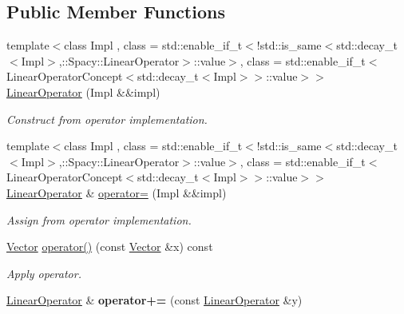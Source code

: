 \subsection*{Public Member Functions}
\begin{DoxyCompactItemize}
\item 
\hypertarget{classSpacy_1_1LinearOperator_aa6de056041a02ac4fbfc457f1539ac8b}{}{\footnotesize template$<$class Impl , class  = std\+::enable\+\_\+if\+\_\+t$<$!std\+::is\+\_\+same$<$std\+::decay\+\_\+t$<$\+Impl$>$,\+::\+Spacy\+::\+Linear\+Operator$>$\+::value$>$, class  = std\+::enable\+\_\+if\+\_\+t$<$\+Linear\+Operator\+Concept$<$std\+::decay\+\_\+t$<$\+Impl$>$$>$\+::value$>$$>$ }\\\hyperlink{classSpacy_1_1LinearOperator_aa6de056041a02ac4fbfc457f1539ac8b}{Linear\+Operator} (Impl \&\&impl)\label{classSpacy_1_1LinearOperator_aa6de056041a02ac4fbfc457f1539ac8b}

\begin{DoxyCompactList}\small\item\em Construct from operator implementation. \end{DoxyCompactList}\item 
\hypertarget{classSpacy_1_1LinearOperator_a7c8ef4165cc858cd8077be677d26cefd}{}{\footnotesize template$<$class Impl , class  = std\+::enable\+\_\+if\+\_\+t$<$!std\+::is\+\_\+same$<$std\+::decay\+\_\+t$<$\+Impl$>$,\+::\+Spacy\+::\+Linear\+Operator$>$\+::value$>$, class  = std\+::enable\+\_\+if\+\_\+t$<$\+Linear\+Operator\+Concept$<$std\+::decay\+\_\+t$<$\+Impl$>$$>$\+::value$>$$>$ }\\\hyperlink{classSpacy_1_1LinearOperator}{Linear\+Operator} \& \hyperlink{classSpacy_1_1LinearOperator_a7c8ef4165cc858cd8077be677d26cefd}{operator=} (Impl \&\&impl)\label{classSpacy_1_1LinearOperator_a7c8ef4165cc858cd8077be677d26cefd}

\begin{DoxyCompactList}\small\item\em Assign from operator implementation. \end{DoxyCompactList}\item 
\hypertarget{classSpacy_1_1LinearOperator_a54d74eb77e706ee2e087a0363929e946}{}\hyperlink{classSpacy_1_1Vector}{Vector} \hyperlink{classSpacy_1_1LinearOperator_a54d74eb77e706ee2e087a0363929e946}{operator()} (const \hyperlink{classSpacy_1_1Vector}{Vector} \&x) const \label{classSpacy_1_1LinearOperator_a54d74eb77e706ee2e087a0363929e946}

\begin{DoxyCompactList}\small\item\em Apply operator. \end{DoxyCompactList}\item 
\hypertarget{classSpacy_1_1LinearOperator_a42c28cd0068a08b7547e44aa6ab4a4e7}{}\hyperlink{classSpacy_1_1LinearOperator}{Linear\+Operator} \& {\bfseries operator+=} (const \hyperlink{classSpacy_1_1LinearOperator}{Linear\+Operator} \&y)\label{classSpacy_1_1LinearOperator_a42c28cd0068a08b7547e44aa6ab4a4e7}


\end{DoxyCompactItemize}
